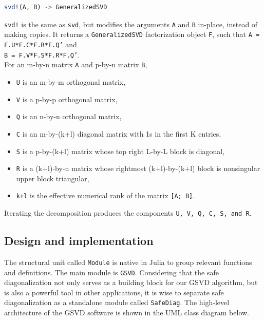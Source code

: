 \begin{lstlisting}[language=julia, style=jlcodestyle]
svd!(A, B) -> GeneralizedSVD
\end{lstlisting}

\texttt{svd!} is the same as \texttt{svd}, but modifies the arguments \texttt{A} and \texttt{B} in-place, instead of making copies. It returns a \texttt{GeneralizedSVD} factorization object \texttt{F}, such that \texttt{A = F.U*F.C*F.R*F.Q'} and \\ 
\texttt{B = F.V*F.S*F.R*F.Q'}. \\
 
For an m-by-n matrix \texttt{A} and p-by-n matrix \texttt{B},

    \begin{itemize}
        \item \texttt{U} is an m-by-m orthogonal matrix,
        \item \texttt{V} is a p-by-p orthogonal matrix,
        \item \texttt{Q} is an n-by-n orthogonal matrix,
        \item \texttt{C} is an m-by-(k+l) diagonal matrix with 1s in the first K entries,
        \item \texttt{S} is a p-by-(k+l) matrix whose top right L-by-L block is diagonal,
        \item \texttt{R} is a (k+l)-by-n matrix whose rightmost (k+l)-by-(k+l) block is nonsingular upper block triangular,
        \item \texttt{k+l} is the effective numerical rank of the matrix \texttt{[A; B]}.
    \end{itemize}
    
Iterating the decomposition produces the components \texttt{U, V, Q, C, S, and R}. 

\subsection{Design and implementation}
The structural unit called \texttt{Module} is native in Julia to group relevant functions and definitions. The main module is \texttt{GSVD}. Considering that the safe diagonalization not only serves as a building block for our GSVD algorithm, but is also a powerful tool in other applications, it is wise to separate safe diagonalization as a standalone module called \texttt{SafeDiag}. The high-level architecture of the GSVD software is shown in the UML class diagram below.


